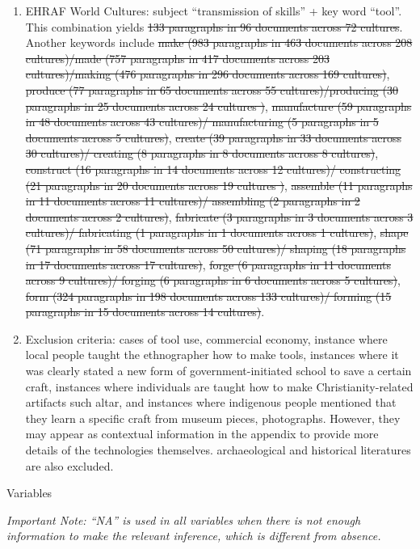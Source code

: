 \documentclass[
  11pt,
]{article}
\begin{document}
\begin{enumerate}
\def\labelenumi{\arabic{enumi}.}
\item
  EHRAF World Cultures: subject ``transmission of skills'' + key word ``tool''. This combination yields \st{133 paragraphs in 96 documents across 72 cultures}. Another keywords include \st{make (983 paragraphs in 463 documents across 208 cultures)/made (757 paragraphs in 417 documents across 203 cultures)/making (476 paragraphs in 296 documents across 169 cultures)}, \st{produce (77 paragraphs in 65 documents across 55 cultures)/producing (30 paragraphs in 25 documents across 24 cultures )}, \st{manufacture (59 paragraphs in 48 documents across 43 cultures)/ manufacturing (5 paragraphs in 5 documents across 5 cultures)}, \st{create (39 paragraphs in 33 documents across 30 cultures)/ creating (8 paragraphs in 8 documents across 8 cultures)}, \st{construct (16 paragraphs in 14 documents across 12 cultures)/ constructing (21 paragraphs in 20 documents across 19 cultures )}, \st{assemble (11 paragraphs in 11 documents across 11 cultures)/ assembling (2 paragraphs in 2 documents across 2 cultures)}, \st{fabricate (3 paragraphs in 3 documents across 3 cultures)/ fabricating (1 paragraphs in 1 documents across 1 cultures)}, \st{shape (71 paragraphs in 58 documents across 50 cultures)/ shaping (18 paragraphs in 17 documents across 17 cultures)}, \st{forge (6 paragraphs in 11 documents across 9 cultures)/ forging (6 paragraphs in 6 documents across 5 cultures)}, \st{form (324 paragraphs in 198 documents across 133 cultures)/ forming (15 paragraphs in 15 documents across 14 cultures)}.
\item
  Exclusion criteria: cases of tool use, commercial economy, instance where local people taught the ethnographer how to make tools, instances where it was clearly stated a new form of government-initiated school to save a certain craft, instances where individuals are taught how to make Christianity-related artifacts such altar, and instances where indigenous people mentioned that they learn a specific craft from museum pieces, photographs. However, they may appear as contextual information in the appendix to provide more details of the technologies themselves. archaeological and historical literatures are also excluded.
\end{enumerate}

Variables

\emph{Important Note: ``NA'' is used in all variables when there is not enough information to make the relevant inference, which is different from absence.}
\end{document}
